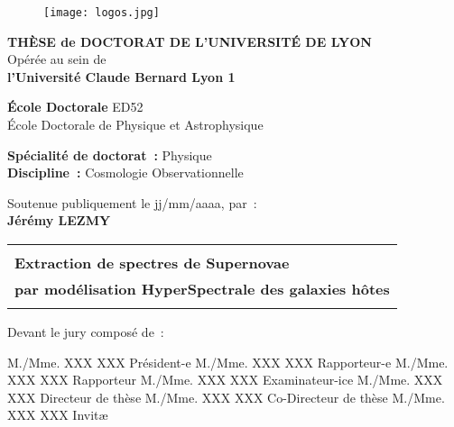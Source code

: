 \documentclass[../main/main.tex]{subfiles}
\begin{document}
\begin{titlepage}
    \begin{center}
        \begin{figure}[h]
            \centering
            \texttt{[image: logos.jpg]}
        \end{figure}

        \vfill

        {\large\bfseries THÈSE de DOCTORAT DE L'UNIVERSITÉ DE LYON\\}
        {Opérée au sein de\\}
        {\large \bfseries l'Université Claude Bernard Lyon 1\\}
        \bigbreak

        {\large \textbf{École Doctorale} ED52\\
        École Doctorale de Physique et Astrophysique}
        \bigbreak

        {\large \textbf{Spécialité de doctorat~:} Physique \\}
        {\large \textbf{Discipline~:} Cosmologie Observationnelle}

        \vfill

        {Soutenue publiquement le jj/mm/aaaa, par~:\\}
        {\Large\bfseries {Jérémy LEZMY}\\}
        \vspace{0.5cm}
        \begin{tabularx}{\linewidth}{Y}
            \toprule
            \\[0.2em]
            \Large \bfseries Extraction de spectres de Supernovae \\
            \Large \bfseries par modélisation HyperSpectrale des galaxies hôtes\\
            \\[-0.2em]
            \bottomrule
        \end{tabularx}

        \vfill

    \end{center}

\vfill

Devant le jury composé de~: \bigbreak

M./Mme. XXX XXX \hfill Président-e\smallbreak
M./Mme. XXX XXX \hfill Rapporteur-e\smallbreak
M./Mme. XXX XXX \hfill Rapporteur\smallbreak
M./Mme. XXX XXX \hfill Examinateur-ice\smallbreak
M./Mme. XXX XXX \hfill Directeur de thèse\smallbreak
M./Mme. XXX XXX \hfill Co-Directeur de thèse\smallbreak
M./Mme. XXX XXX \hfill Invitæ\smallbreak

\vfill

\end{titlepage}
\end{document}
